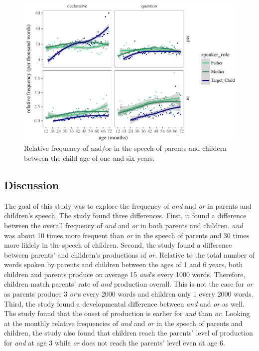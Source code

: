 \documentclass[oneside]{report}
\theoremstyle{definition}
\theoremstyle{definition}
\theoremstyle{definition}
\theoremstyle{remark}
\begin{document}
\begin{figure}[tb]

{\centering \includegraphics{figs/ageSpeechActPlot-1} 

}

\caption{Relative frequency of and/or in the speech of parents and childern between the child age of one and six years.}\label{fig:ageSpeechActPlot}
\end{figure}
\subsection{Discussion}\label{study1discussion}

The goal of this study was to explore the frequency of \emph{and} and
\emph{or} in parents and children's speech. The study found three
differences. First, it found a difference between the overall frequency
of \emph{and} and \emph{or} in both parents and children. \emph{and} was
about 10 times more frequent than \emph{or} in the speech of parents and
30 times more liklely in the speech of children. Second, the study found
a difference between parents' and children's productions of \emph{or}.
Relative to the total number of words spoken by parents and children
between the ages of 1 and 6 years, both children and parents produce on
average 15 \emph{and}`s every 1000 words. Therefore, children match
parents' rate of \emph{and} production overall. This is not the case for
\emph{or} as parents produce 3 \emph{or}`s every 2000 words and children
only 1 every 2000 words. Third, the study found a developmental
difference between \emph{and} and \emph{or} as well. The study found
that the onset of production is earlier for \emph{and} than \emph{or}.
Looking at the monthly relative frequencies of \emph{and} and \emph{or}
in the speech of parents and children, the study also found that
children reach the parents' level of production for \emph{and} at age 3
while \emph{or} does not reach the parents' level even at age 6.
\end{document}
